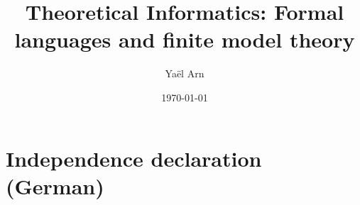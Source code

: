 \documentclass[a4paper,11pt]{report}
\title %
{Theoretical Informatics: Formal languages and finite model theory}
\date{\today}   %
\author{Yaël Arn}  %
\theoremstyle{definition}
\theoremstyle{definition}
\begin{document}


\onehalfspacing %



\newpage
{}
\tableofcontents %
\newpage %

\renewcommand{\chaptermark}[1]{\markboth{\MakeUppercase{\thechapter.\ #1}}{}} %
\renewcommand{\sectionmark}[1]{\markright{\thesection.\ #1}{}} %
\fancyhead[R]{\rightmark}
\fancyhead[L]{\leftmark}
\fancyhead[L]{\leftmark}
\fancyhead[R]{\rightmark}
\pagestyle{fancy}







\cleardoublepage %
\nocite{*}
\printbibliography %

\appendix



\chapter{Independence declaration (German)}\label{ch:appendix_independencedeclaration}



\end{document}
